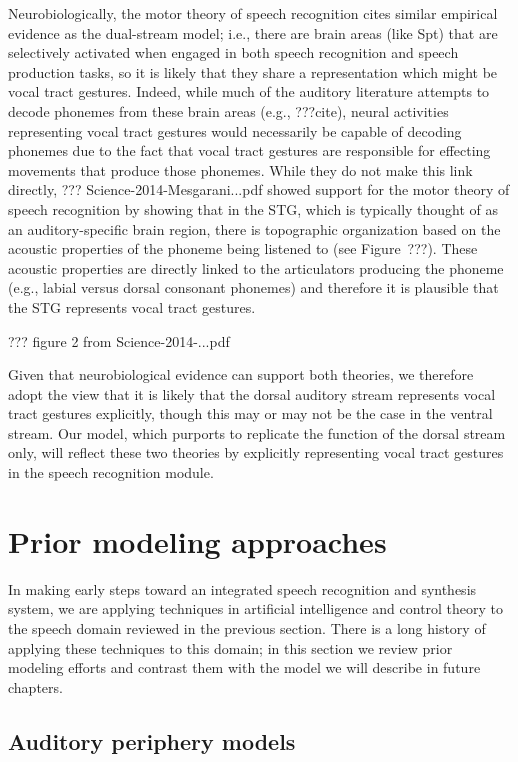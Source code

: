 Neurobiologically,
the motor theory of speech recognition
cites similar empirical evidence as
the dual-stream model;
i.e., there are brain areas (like Spt)
that are selectively activated
when engaged in both speech recognition
and speech production tasks,
so it is likely that they share
a representation which might be vocal tract gestures.
Indeed, while much of the auditory literature
attempts to decode phonemes
from these brain areas
(e.g., ???cite),
neural activities representing vocal tract gestures
would necessarily be capable of
decoding phonemes due to the fact that
vocal tract gestures are responsible
for effecting movements that produce
those phonemes.
While they do not make this link directly,
??? Science-2014-Mesgarani...pdf
showed support for the motor theory of speech recognition
by showing that in the STG,
which is typically thought of
as an auditory-specific brain region,
there is topographic organization
based on the acoustic properties
of the phoneme being listened to
(see Figure~???).
These acoustic properties are
directly linked to the articulators
producing the phoneme
(e.g., labial versus dorsal consonant phonemes)
and therefore it is plausible that
the STG represents vocal tract gestures.

??? figure 2 from Science-2014-...pdf

Given that neurobiological evidence can
support both theories,
we therefore adopt the view that
it is likely that
the dorsal auditory stream
represents vocal tract gestures explicitly,
though this may or may not be the case
in the ventral stream.
Our model, which purports to replicate
the function of the dorsal stream only,
will reflect these two theories
by explicitly representing vocal tract gestures
in the speech recognition module.

\section{Prior modeling approaches}

In making early steps toward
an integrated speech recognition and synthesis system,
we are applying techniques
in artificial intelligence and control theory
to the speech domain reviewed in the previous section.
There is a long history of applying these techniques
to this domain;
in this section we review prior modeling efforts
and contrast them with the model we will describe
in future chapters.

\subsection{Auditory periphery models}

